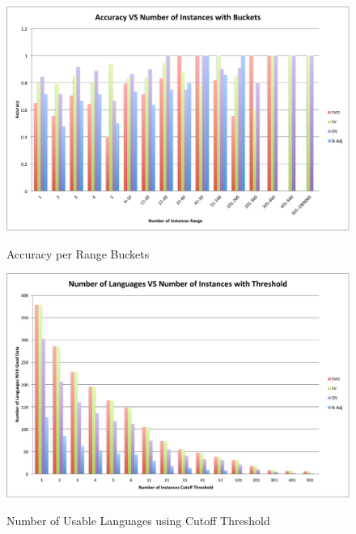 \documentclass[]{aiaa-tc}
\begin{document}
\begin{figure}[H]
\caption{Accuracy per Range Buckets}
\hspace{-2mm} 
\includegraphics[width=\textwidth]{AccuracyVsNumberOfInstancesWithBuckets.pdf}
\label{fig:label}
\end{figure}

\begin{figure}[H]
\caption{Number of Usable Languages using Cutoff Threshold}
\hspace{-2mm} 
\includegraphics[width=\textwidth]{NumberOfLanguagesVsNumberOfInstancesWithThreshold.pdf}
\label{fig:label}
\end{figure}
\end{document}
